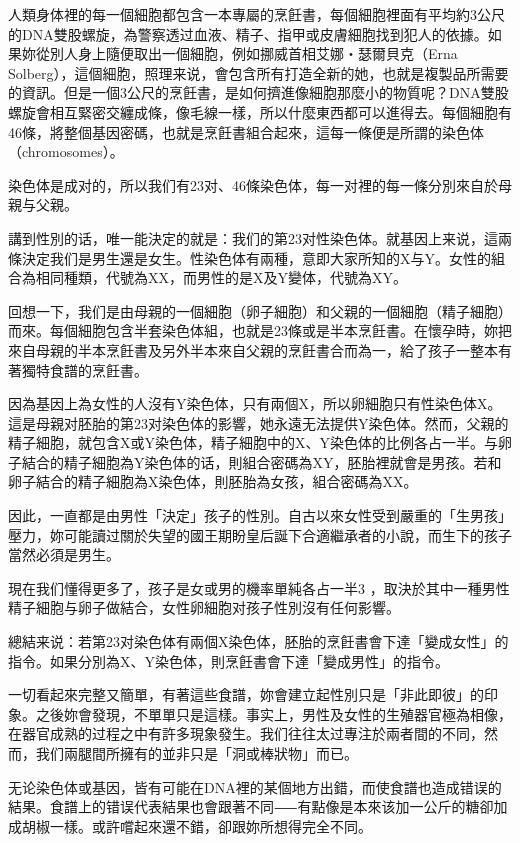 \documentclass[12pt,UTF8]{ctexbook}
\begin{document}
人類身体裡的每一個細胞都包含一本專屬的烹飪書，每個細胞裡面有平均約3公尺的DNA雙股螺旋，為警察透过血液、精子、指甲或皮膚細胞找到犯人的依據。如果妳從別人身上隨便取出一個細胞，例如挪威首相艾娜‧瑟爾貝克（Erna Solberg），這個細胞，照理来说，會包含所有打造全新的她，也就是複製品所需要的資訊。但是一個3公尺的烹飪書，是如何擠進像細胞那麼小的物質呢？DNA雙股螺旋會相互緊密交纏成條，像毛線一樣，所以什麼東西都可以進得去。每個細胞有46條，將整個基因密碼，也就是烹飪書組合起來，這每一條便是所謂的染色体（chromosomes）。

染色体是成对的，所以我们有23对、46條染色体，每一对裡的每一條分別來自於母親与父親。

講到性別的话，唯一能決定的就是：我们的第23对性染色体。就基因上来说，這兩條決定我们是男生還是女生。性染色体有兩種，意即大家所知的X与Y。女性的組合為相同種類，代號為XX，而男性的是X及Y變体，代號為XY。

回想一下，我们是由母親的一個細胞（卵子細胞）和父親的一個細胞（精子細胞）而來。每個細胞包含半套染色体組，也就是23條或是半本烹飪書。在懷孕時，妳把來自母親的半本烹飪書及另外半本來自父親的烹飪書合而為一，給了孩子一整本有著獨特食譜的烹飪書。

因為基因上為女性的人沒有Y染色体，只有兩個X，所以卵細胞只有性染色体X。這是母親对胚胎的第23对染色体的影響，她永遠无法提供Y染色体。然而，父親的精子細胞，就包含X或Y染色体，精子細胞中的X、Y染色体的比例各占一半。与卵子結合的精子細胞為Y染色体的话，則組合密碼為XY，胚胎裡就會是男孩。若和卵子結合的精子細胞為X染色体，則胚胎為女孩，組合密碼為XX。

因此，一直都是由男性「決定」孩子的性別。自古以來女性受到嚴重的「生男孩」壓力，妳可能讀过關於失望的國王期盼皇后誕下合適繼承者的小說，而生下的孩子當然必須是男生。

現在我们懂得更多了，孩子是女或男的機率單純各占一半3 ，取決於其中一種男性精子細胞与卵子做結合，女性卵細胞对孩子性別沒有任何影響。

總結来说：若第23对染色体有兩個X染色体，胚胎的烹飪書會下達「變成女性」的指令。如果分別為X、Y染色体，則烹飪書會下達「變成男性」的指令。

一切看起來完整又簡單，有著這些食譜，妳會建立起性別只是「非此即彼」的印象。之後妳會發現，不單單只是這樣。事实上，男性及女性的生殖器官極為相像，在器官成熟的过程之中有許多現象發生。我们往往太过專注於兩者間的不同，然而，我们兩腿間所擁有的並非只是「洞或棒狀物」而已。

无论染色体或基因，皆有可能在DNA裡的某個地方出錯，而使食譜也造成错误的結果。食譜上的错误代表結果也會跟著不同⸺有點像是本來该加一公斤的糖卻加成胡椒一樣。或許嚐起來還不錯，卻跟妳所想得完全不同。
\end{document}
